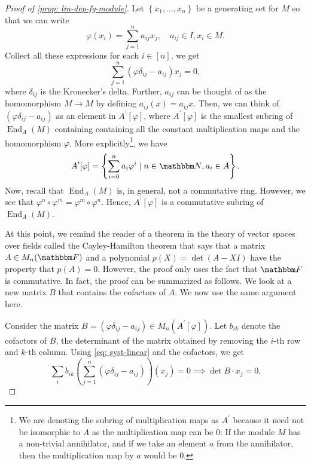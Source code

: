 \begin{proof}[Proof of \cref{prop: lin-dep-fg-module}]
    Let $\left\{x_{1}, \ldots, x_{n}\right\}$ be a generating set for $M$ so that we can write 
    \[
    \varphi\left(x_{i}\right)=\sum_{j=1}^{n} a_{i j} x_{j},\quad a_{ij} \in I, x_i \in M.
    \] 
    Collect all these expressions for each $i \in [n]$, we get
    \begin{equation}\label{eq: syst-linear}
        \sum_{j=1}^{n}\left(\varphi \delta_{i j}-a_{i j}\right) x_{j}=0,
    \end{equation}
    where $\delta_{i j}$ is the Kronecker's delta. Further, $a_{i j}$ can be thought of as the homomorphism $M \longrightarrow M$ by defining $a_{i j}(x)=a_{i j} x$. Then, we can think of $\left(\varphi \delta_{i j}-a_{i j}\right)$ as an element in $A^{\prime}[\varphi]$, where $A^{\prime}[\varphi]$ is the smallest subring of $\operatorname{End}_{A}(M)$ containing containing all the constant multiplication maps and the homomorphism $\varphi$. More explicitly\footnote{We are denoting the subring of multiplication maps as $A^{\prime}$ because it need not be isomorphic to $A$ as the multiplication map can be 0: If the module $M$ has a non-trivial annihilator, and if we take an element $a$ from the annihilator, then the multiplication map by $a$ would be 0.}, we have
    \[
    A^{\prime}[\varphi]=\left\{\sum_{i=0}^{n} a_{i} \varphi^{i} \mid n \in {\N}, a_{i} \in A\right\}.
    \]
    Now, recall that $\operatorname{End}_{A}(M)$ is, in general, not a commutative ring. However, we see that $\varphi^{n} \circ \varphi^{m}=\varphi^{m} \circ \varphi^{n}$. Hence, $A^{\prime}[\varphi]$ is a commutative subring of $\operatorname{End}_{A}(M)$.

    At this point, we remind the reader of a theorem in the theory of vector spaces over fields called the Cayley-Hamilton theorem that says that a matrix $A \in M_{n}(\F)$ and a polynomial $p(X)=\operatorname{det}(A-X I)$ have the property that $p(A)=0$. However, the proof only uses the fact that $\F$ is commutative. In fact, the proof can be summarized as follows. We look at a new matrix $B$ that contains the cofactors of $A$. We now use the same argument here.

    Consider the matrix $B=\left(\varphi \delta_{i j}-a_{i j}\right) \in M_{n}\left(A^{\prime}[\varphi]\right)$. Let $b_{i k}$ denote the cofactors of $B$, the determinant of the matrix obtained by removing the $i$-th row and $k$-th column. Using \eqref{eq: syst-linear} and the cofactors, we get
    $$
    \sum_{i} b_{i k}\left(\sum_{j=1}^{n}\left(\varphi \delta_{i j}-a_{i j}\right)\right)\left(x_{j}\right)=0 \implies \det{B}\cdot x_j = 0.
    $$
    

\end{proof}
